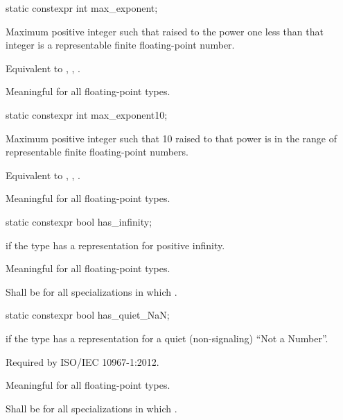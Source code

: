 %
\begin{itemdecl}
static constexpr int max_exponent;
\end{itemdecl}

\begin{itemdescr}
\pnum
Maximum positive integer such that
raised to the power one less than that integer is a representable finite
floating-point number.
\begin{footnote}
Equivalent to ,
, .
\end{footnote}

\pnum
Meaningful for all floating-point types.
\end{itemdescr}

%
\begin{itemdecl}
static constexpr int max_exponent10;
\end{itemdecl}

\begin{itemdescr}
\pnum
Maximum positive integer such that 10 raised to that power is in the
range of representable finite floating-point numbers.
\begin{footnote}
Equivalent to
, , .
\end{footnote}

\pnum
Meaningful for all floating-point types.
\end{itemdescr}

%
\begin{itemdecl}
static constexpr bool has_infinity;
\end{itemdecl}

\begin{itemdescr}
\pnum
{} if the type has a representation for positive infinity.

\pnum
Meaningful for all floating-point types.

\pnum
Shall be
for all specializations in which
.
\end{itemdescr}

%
\begin{itemdecl}
static constexpr bool has_quiet_NaN;
\end{itemdecl}

\begin{itemdescr}
\pnum
{} if the type has a representation for a quiet (non-signaling) ``Not a
Number''.
\begin{footnote}
Required by ISO/IEC 10967-1:2012.
\end{footnote}

\pnum
Meaningful for all floating-point types.

\pnum
Shall be
for all specializations in which
.
\end{itemdescr}

